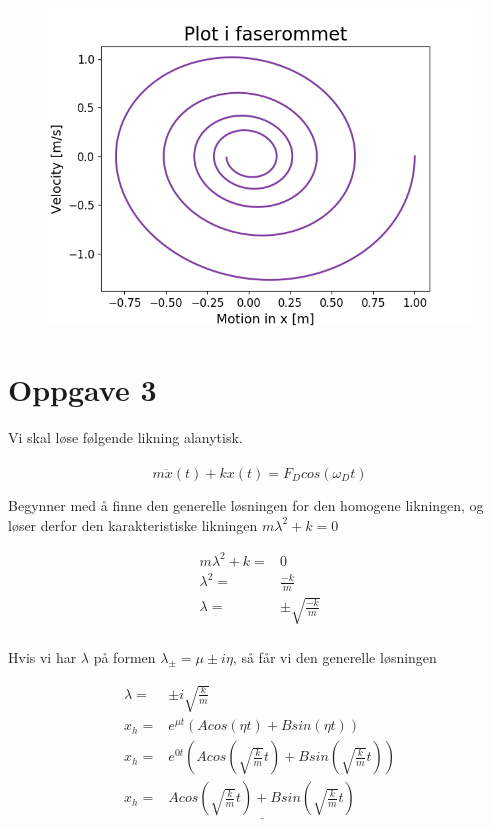\documentclass[norsk,a4paper,12pt]{article}
\begin{document}
\begin{figure}
\includegraphics[scale=0.8]{Oppgave2.png}
\end{figure}


\section*{Oppgave 3}

Vi skal løse følgende likning alanytisk.
\\
\\
\begin{equation}
	m \ddot{x}(t) +kx(t) = F_D cos(\omega_Dt)
\end{equation}

Begynner med å finne den generelle løsningen for den homogene likningen, og løser derfor den karakteristiske likningen $m\lambda^2 + k = 0$

\begin{align*}
	m\lambda^2 + k =& 0 \\
	\lambda^2 =& \frac{-k}{m} \\
	\lambda =& \pm \sqrt{\frac{-k}{m}}\\
\end{align*}

Hvis vi har $\lambda$ på formen $\lambda_{\pm} = \mu \pm i\eta$, så får vi den generelle løsningen

\begin{align*}
	\lambda =& \pm i \sqrt{\frac{k}{m}}\\
	x_h =& e^{\mu t}(A cos(\eta t) + B sin(\eta t))\\
	x_h =& e^{0t} \left(A cos \left(\sqrt{\frac{k}{m}}t\right) +B sin \left(\sqrt{\frac{k}{m}}t \right) \right)\\
	x_h =& \underline{A cos \left(\sqrt{\frac{k}{m}}t \right) +B sin \left(\sqrt{\frac{k}{m}}t \right)}\\
\end{align*}
\end{document}
